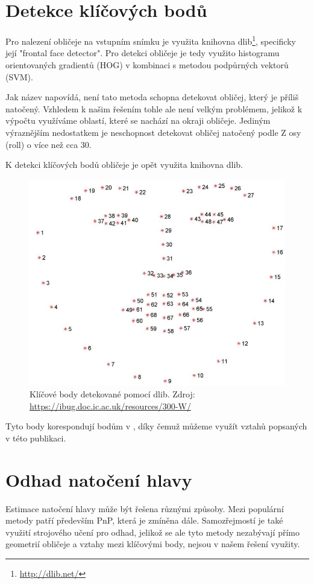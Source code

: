 \documentclass[12pt,a4paper,titlepage,final]{report}
\begin{document}
\section{Detekce klíčových bodů}
Pro nalezení obličeje na vstupním snímku je využita knihovna dlib\footnote{\url{http://dlib.net/}}, specificky její "frontal face detector". Pro detekci obličeje je tedy využito histogramu orientovaných gradientů (HOG) v kombinaci s metodou podpůrných vektorů (SVM).

Jak název napovídá, není tato metoda schopna detekovat obličej, který je příliš natočený. Vzhledem k našim řešením tohle ale není velkým problémem, jelikož k výpočtu využíváme oblastí, které se nachází na okraji obličeje. Jediným výraznějším nedostatkem je neschopnost detekovat obličej natočený podle Z osy (roll) o více než cca 30\degree.

K detekci klíčových bodů obličeje je opět využita knihovna dlib. 

\begin{figure}[H]
    \centering
    \includegraphics[scale=0.35]{images/detected_landmarks.jpeg}
    \caption{Klíčové body detekované pomocí dlib. Zdroj: \url{https://ibug.doc.ic.ac.uk/resources/300-W/}}
    \label{fig:dlib_key_points}
\end{figure}

Tyto body korespondují bodům v \cite{antro_points}, díky čemuž můžeme využít vztahů popsaných v této publikaci.

\section{Odhad natočení hlavy}
Estimace natočení hlavy může být řešena různými způsoby. Mezi populární metody patří především PnP, která je zmíněna dále. Samozřejmostí je také využití strojového učení pro odhad, jelikož se ale tyto metody nezabývají přímo geometrií obličeje a vztahy mezi klíčovými body, nejsou v našem řešení využity.
\end{document}
